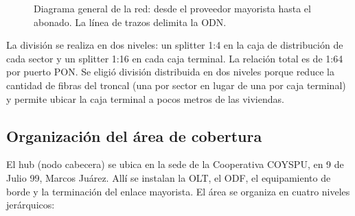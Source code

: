 \begin{figure}[H]
{%
    }
    \caption{Diagrama general de la red: desde el proveedor mayorista hasta el abonado. La línea de trazos delimita la ODN.}
    \label{fig:diagrama_general}
\end{figure}

La división se realiza en dos niveles: un splitter 1:4 en la caja de distribución de cada sector y un splitter 1:16 en cada caja terminal. La relación total es de 1:64 por puerto PON. Se eligió división distribuida en dos niveles porque reduce la cantidad de fibras del troncal (una por sector en lugar de una por caja terminal) y permite ubicar la caja terminal a pocos metros de las viviendas.

\subsection{Organización del área de cobertura}
\label{sec:organizacion}
El hub (nodo cabecera) se ubica en la sede de la Cooperativa COYSPU, en 9 de Julio 99, Marcos Juárez. Allí se instalan la OLT, el ODF, el equipamiento de borde y la terminación del enlace mayorista. El área se organiza en cuatro niveles jerárquicos:

